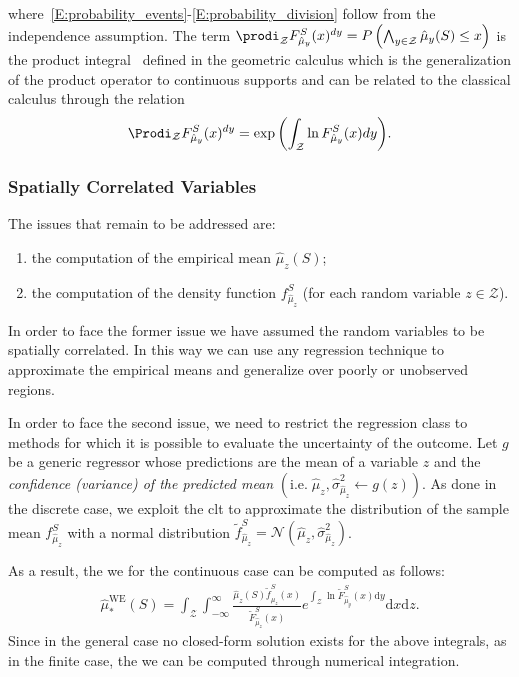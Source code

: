\noindent where~\ref{E:probability_events}-\ref{E:probability_division} follow from the independence assumption.
The term $\prodi_{\mathcal{Z}} F^S_{\hat{\mu}_y}(x)^{dy} = P \left( \bigwedge_{y \in \mathcal{Z}} \hat{\mu}_y(S) \leq x \right)$ is the product integral~\cite{grossman1972non} defined in the geometric calculus which is the generalization of the product operator to continuous supports and can be related to the classical calculus through the relation
\begin{equation}
 \Prodi_{\mathcal{Z}} F_{\hat{\mu}_y}^S(x)^{dy} = \exp{\left( \int_{\mathcal{Z}} \ln F_{\hat{\mu}_y}^S(x)dy \right)}.
\end{equation}

\subsubsection{Spatially Correlated Variables}
The issues that remain to be addressed are:
\begin{enumerate}
 \item the computation of the empirical mean $\hat{\mu}_z(S)$;
 \item the computation of the density function $f_{\hat{\mu}_z}^S$ (for each random variable $z \in \mathcal{Z}$).
\end{enumerate}
In order to face the former issue we have assumed the random variables to be spatially correlated.
In this way we can use any regression technique to approximate the empirical means and generalize over poorly or unobserved regions.

In order to face the second issue, we need to restrict the regression class to methods for which it is possible to evaluate the uncertainty of the outcome.
Let $g$ be a generic regressor whose predictions are the mean of a variable $z$ and the \emph{confidence (variance) of the predicted mean} $\left(\text{i.e.}\; \hat{\mu}_z, \hat{\sigma}_{\hat{\mu}_z}^2 \leftarrow g(z) \right)$.
As done in the discrete case, we exploit the \gls{clt} to approximate the distribution of the sample mean $f_{\hat{\mu}_z}^S$ with a normal distribution $\tilde{f}_{\hat{\mu}_z}^S = \mathcal{N}\left(\hat{\mu}_z, \hat{\sigma}^2_{\hat{\mu}_z} \right)$.

As a result, the \gls{we} for the continuous case can be computed as follows:
\begin{align}\label{E:continuousWE2}
\hat{\mu}_*^{\textrm{WE}}(S) = \int_{\mathcal{Z}} \int_{-\infty}^{\infty}  \frac{\hat{\mu}_z(S)  \tilde{f}_{\hat{\mu}_z}^S(x)}{\tilde{F}_{\hat{\mu}_z}^S(x)} e^{\int_{\mathcal{Z}} \ln \tilde{F}_{\hat{\mu}_y}^S(x)\mathrm{d}y}\mathrm{d}x\mathrm{d}z.
\end{align}
Since in the general case no closed-form solution exists for the above integrals, as in the finite case, the \gls{we} can be computed through numerical integration.

